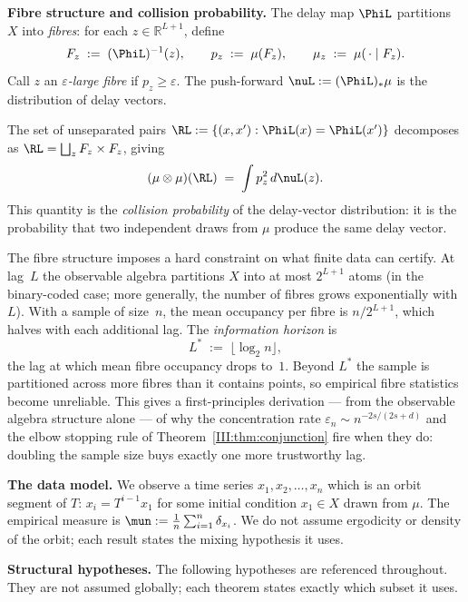 \textbf{Fibre structure and collision probability.}\label{III:subsec:fibres}\enspace
The delay map $\PhiL$ partitions $X$ into \emph{fibres}: for each
$z \in \mathbb{R}^{L+1}$, define
\[
  F_z \;:=\; (\PhiL)^{-1}(z), \qquad
  p_z \;:=\; \mu(F_z), \qquad
  \mu_z \;:=\; \mu(\,\cdot\mid F_z).
\]
Call $z$ an \emph{$\varepsilon$-large fibre} if $p_z \geq \varepsilon$.
The push-forward $\nuL := (\PhiL)_*\mu$ is the distribution of
delay vectors.

The set of unseparated pairs $\RL := \{(x,x') : \PhiL(x) = \PhiL(x')\}$
decomposes as $\RL = \bigsqcup_z F_z \times F_z$, giving
\begin{equation}
  (\mu \otimes \mu)(\RL)
  \;=\; \int p_z^2\,d\nuL(z).
  \label{III:eq:collision-prob}
\end{equation}
This quantity is the \emph{collision probability} of the delay-vector
distribution: it is the probability that two independent draws from $\mu$
produce the same delay vector.

\begin{remark}
\label{III:rem:info-horizon}
The fibre structure imposes a hard constraint on what finite data can certify.
At lag~$L$ the observable algebra partitions $X$ into at most $2^{L+1}$
atoms (in the binary-coded case; more generally, the number of fibres grows
exponentially with $L$).
With a sample of size~$n$, the mean occupancy per fibre is $n/2^{L+1}$, which
halves with each additional lag.
The \emph{information horizon} is
\[
  L^* \;:=\; \lfloor \log_2 n \rfloor,
\]
the lag at which mean fibre occupancy drops to~$1$.
Beyond $L^*$ the sample is partitioned across more fibres than it contains
points, so empirical fibre statistics become unreliable.
This gives a first-principles derivation --- from the observable algebra
structure alone --- of why the concentration rate $\varepsilon_n \sim n^{-2s/(2s+d)}$
and the elbow stopping rule of Theorem~\ref{III:thm:conjunction} fire when they do:
doubling the sample size buys exactly one more trustworthy lag.
\end{remark}

\textbf{The data model.}\enspace
We observe a time series $x_1, x_2, \ldots, x_n$ which is an orbit segment of
$T$: $x_i = T^{i-1}x_1$ for some initial condition $x_1 \in X$ drawn from
$\mu$.
The empirical measure is $\mun := \frac{1}{n}\sum_{i=1}^n \delta_{x_i}$.
We do not assume ergodicity or density of the orbit; each result states the
mixing hypothesis it uses.

\textbf{Structural hypotheses.}\enspace
The following hypotheses are referenced throughout.
They are not assumed globally; each theorem states exactly which subset it uses.

